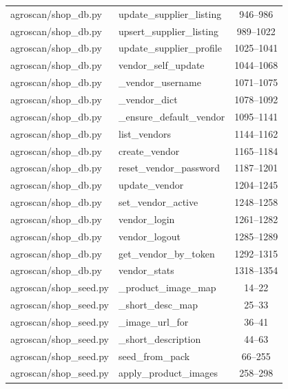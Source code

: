 \begin{center}
\begin{longtable}{@{}p{4.6cm}p{5.2cm}c@{}}
agroscan/shop\_db.py & update\_supplier\_listing & 946--986 \\
agroscan/shop\_db.py & upsert\_supplier\_listing & 989--1022 \\
agroscan/shop\_db.py & update\_supplier\_profile & 1025--1041 \\
agroscan/shop\_db.py & vendor\_self\_update & 1044--1068 \\
agroscan/shop\_db.py & \_vendor\_username & 1071--1075 \\
agroscan/shop\_db.py & \_vendor\_dict & 1078--1092 \\
agroscan/shop\_db.py & \_ensure\_default\_vendor & 1095--1141 \\
agroscan/shop\_db.py & list\_vendors & 1144--1162 \\
agroscan/shop\_db.py & create\_vendor & 1165--1184 \\
agroscan/shop\_db.py & reset\_vendor\_password & 1187--1201 \\
agroscan/shop\_db.py & update\_vendor & 1204--1245 \\
agroscan/shop\_db.py & set\_vendor\_active & 1248--1258 \\
agroscan/shop\_db.py & vendor\_login & 1261--1282 \\
agroscan/shop\_db.py & vendor\_logout & 1285--1289 \\
agroscan/shop\_db.py & get\_vendor\_by\_token & 1292--1315 \\
agroscan/shop\_db.py & vendor\_stats & 1318--1354 \\
agroscan/shop\_seed.py & \_product\_image\_map & 14--22 \\
agroscan/shop\_seed.py & \_short\_desc\_map & 25--33 \\
agroscan/shop\_seed.py & \_image\_url\_for & 36--41 \\
agroscan/shop\_seed.py & \_short\_description & 44--63 \\
agroscan/shop\_seed.py & seed\_from\_pack & 66--255 \\
agroscan/shop\_seed.py & apply\_product\_images & 258--298 \\
\bottomrule
\end{longtable}
\end{center}